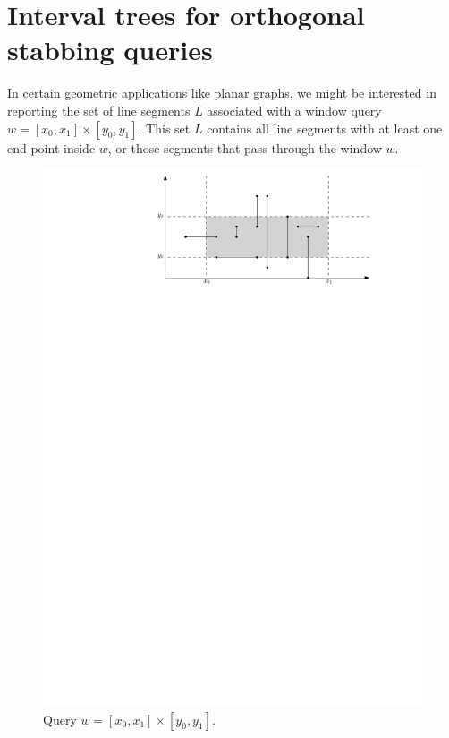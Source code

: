 \section{Interval trees for orthogonal stabbing queries}
\label{sec:interval-trees}

In certain geometric applications like planar graphs, we might be interested in reporting the set of line segments $L$ associated with a window query  $w = [x_0, x_1] \times [y_0, y_1]$. 
%
This set $L$ contains all line segments with at least one end point inside $w$, or those segments that pass through the window $w$. 

\begin{figure}[ht!]
\centering
\includegraphics[scale=.8]{ipe/window-query.pdf}
\caption{Query $w = [x_0 , x_1] \times [y_0, y_1]$. }
\label{fig:stabbing-line}
\end{figure}


